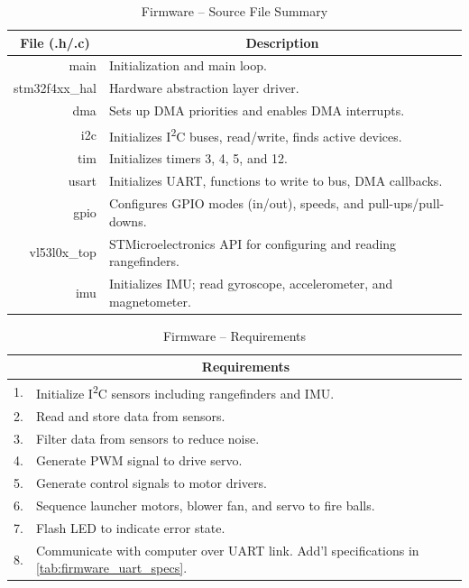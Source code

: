 \begin{table}[H]
	\centering	\caption{Firmware -- Source File Summary} 	\label{tab:firmware_file_desc}
	\begin{tabular}{rl}
		\toprule 
		\multicolumn{1}{c}{File (.h/.c)} & \multicolumn{1}{c}{Description} \\ 
		\midrule 
		main & Initialization and main loop. \\  
		stm32f4xx\_hal & Hardware abstraction layer driver. \\  			
		dma & Sets up DMA priorities and enables DMA interrupts. \\  		
		i2c & Initializes I\textsuperscript{2}C buses, read/write, finds active devices. \\  		
		tim & Initializes timers 3, 4, 5, and 12. \\  		
		usart & Initializes UART, functions to write to bus, DMA callbacks. \\  		
		gpio & Configures GPIO modes (in/out), speeds, and pull-ups/pull-downs. \\  		
		vl53l0x\_top & STMicroelectronics API for configuring and reading rangefinders. \\  				 
		imu & Initializes IMU; read gyroscope, accelerometer, and magnetometer. \\ 
		\bottomrule 		
	\end{tabular} 
\end{table}

\begin{table}[H]
	\centering	\caption{Firmware -- Requirements} 	\label{tab:firmware_specs}
	\begin{tabular}{cl}
		\toprule 
		 & \multicolumn{1}{c}{Requirements} \\ 
		 \midrule 
		1. & Initialize I\textsuperscript{2}C sensors including rangefinders and IMU. \\  
		2. & Read and store data from sensors. \\  
		3. & Filter data from sensors to reduce noise. \\  
		4. & Generate PWM signal to drive servo. \\  
		5. & Generate control signals to motor drivers. \\  
		6. & Sequence launcher motors, blower fan, and servo to fire balls. \\  
		7. & Flash LED to indicate error state. \\  
		8. & Communicate with computer over UART link. Add'l specifications in \ref{tab:firmware_uart_specs}. \\ \bottomrule 
	\end{tabular} 
\end{table}

